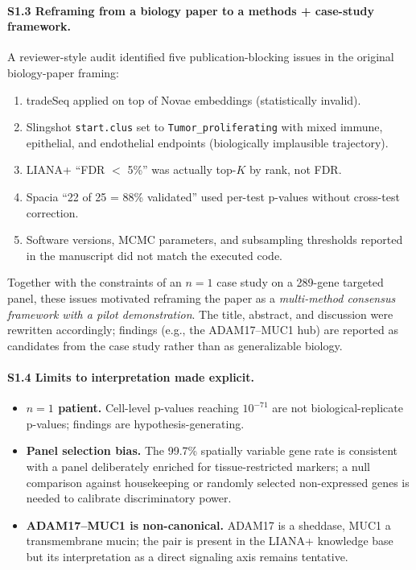 \documentclass[12pt,a4paper]{article}
\begin{document}
\paragraph{S1.3 Reframing from a biology paper to a methods + case-study framework.}
A reviewer-style audit identified five publication-blocking issues in the original biology-paper framing:
\begin{enumerate}
    \item tradeSeq applied on top of Novae embeddings (statistically invalid).
    \item Slingshot \texttt{start.clus} set to \texttt{Tumor\_proliferating} with mixed immune, epithelial, and endothelial endpoints (biologically implausible trajectory).
    \item LIANA+ ``FDR $<$ 5\%'' was actually top-$K$ by rank, not FDR.
    \item Spacia ``22 of 25 = 88\% validated'' used per-test p-values without cross-test correction.
    \item Software versions, MCMC parameters, and subsampling thresholds reported in the manuscript did not match the executed code.
\end{enumerate}
Together with the constraints of an $n=1$ case study on a 289-gene targeted panel, these issues motivated reframing the paper as a \textit{multi-method consensus framework with a pilot demonstration}. The title, abstract, and discussion were rewritten accordingly; findings (e.g., the ADAM17--MUC1 hub) are reported as candidates from the case study rather than as generalizable biology.

\paragraph{S1.4 Limits to interpretation made explicit.}
\begin{itemize}
    \item \textbf{$n=1$ patient.} Cell-level p-values reaching $10^{-71}$ are not biological-replicate p-values; findings are hypothesis-generating.
    \item \textbf{Panel selection bias.} The 99.7\% spatially variable gene rate is consistent with a panel deliberately enriched for tissue-restricted markers; a null comparison against housekeeping or randomly selected non-expressed genes is needed to calibrate discriminatory power.
    \item \textbf{ADAM17--MUC1 is non-canonical.} ADAM17 is a sheddase, MUC1 a transmembrane mucin; the pair is present in the LIANA+ knowledge base but its interpretation as a direct signaling axis remains tentative.
\end{itemize}
\end{document}
